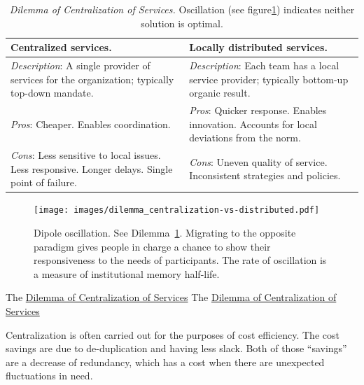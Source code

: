 \begin{center}
\begin{table}[H] %
\begin{tabular}{ | m{\dilemmatablewidth}| m{\dilemmatablewidth} | } 
  \hline
  \textbf{Centralized services.} &
  \textbf{Locally distributed services.} \\
  \hline
  \textit{Description}: A single provider of services for the organization; typically top-down mandate. &
  \textit{Description}: Each team has a local service provider; typically bottom-up organic result. \\  
  \hline
  \textit{Pros}: Cheaper. Enables coordination. &
  \textit{Pros}: Quicker response. 
  Enables innovation. 
  Accounts for local deviations from the norm. \\
  \hline
  \textit{Cons}: Less sensitive to local issues. Less responsive. Longer delays. Single point of failure.  & 
  \textit{Cons}: Uneven quality of service. Inconsistent strategies and policies. \\
  \hline
\end{tabular}
\caption{
\textit{Dilemma of Centralization of Services.}
Oscillation (see figure\ref{fig:central-vs-distributed}) indicates neither solution is optimal.
}
\label{table:central-vs-distributed}
\end{table}
\end{center}

\begin{figure}[H] %
    \centering
    \texttt{[image: images/dilemma\_centralization-vs-distributed.pdf]}
    \caption{Dipole oscillation. See Dilemma~\ref{table:central-vs-distributed}. Migrating to the opposite paradigm gives people in charge a chance to show their responsiveness to the needs of participants. The rate of oscillation is a measure of institutional memory half-life.}
    \label{fig:central-vs-distributed}
\end{figure}


The \href{table:central-vs-distributed}{Dilemma of Centralization of Services}
The \href{table:central-vs-distributed}{Dilemma of Centralization of Services}


Centralization is often carried out for the purposes of cost efficiency. The cost savings are due to de-duplication and having less slack. Both of those ``savings'' are a decrease of redundancy, which has a cost when there are unexpected fluctuations in need. 

